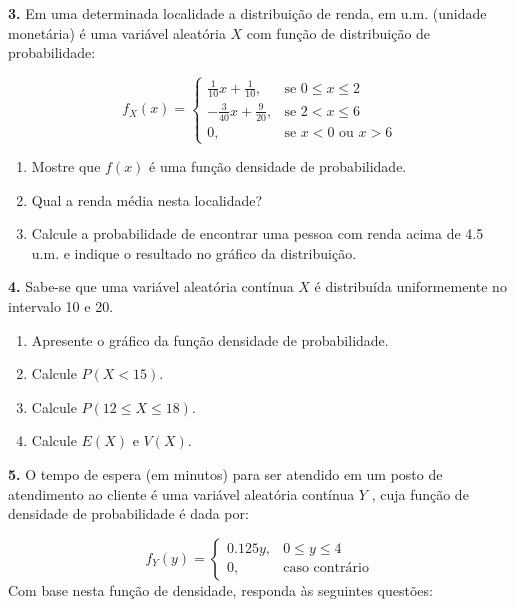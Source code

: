 \documentclass[
]{book}
\providecommand{\tightlist}{%
  \setlength{\itemsep}{0pt}\setlength{\parskip}{0pt}}
\begin{document}
\textbf{3.} Em uma determinada localidade a distribuição de renda, em u.m. (unidade monetária) é uma variável aleatória \(X\) com função de distribuição de probabilidade:

\[
f_{X}(x) = 
\begin{cases} 
\frac{1}{10}x + \frac{1}{10}, & \text{se } 0 \leq x \leq 2 \\[10pt]
-\frac{3}{40}x + \frac{9}{20}, & \text{se } 2 < x \leq 6 \\[10pt]
0, & \text{se } x < 0 \text{ ou } x > 6
\end{cases}
\]

\begin{enumerate}
\def\labelenumi{(\alph{enumi})}
\tightlist
\item
  Mostre que \(f(x)\) é uma função densidade de probabilidade.
\item
  Qual a renda média nesta localidade?
\item
  Calcule a probabilidade de encontrar uma pessoa com renda acima de 4.5 u.m. e indique o resultado no gráfico da distribuição.
\end{enumerate}

\textbf{4.} Sabe-se que uma variável aleatória contínua \(X\) é distribuída uniformemente no intervalo 10 e 20.

\begin{enumerate}
\def\labelenumi{(\alph{enumi})}
\tightlist
\item
  Apresente o gráfico da função densidade de probabilidade.
\item
  Calcule \(P(X < 15)\).
\item
  Calcule \(P(12\leq X \leq 18)\).
\item
  Calcule \(E(X)\) e \(V(X)\).
\end{enumerate}

\textbf{5.} O tempo de espera (em minutos) para ser atendido em um posto de atendimento ao cliente é uma variável aleatória contínua \(Y\) , cuja função de densidade de probabilidade é dada por:

\[
f_{Y}(y) = 
\begin{cases} 
0.125y, & 0\leq y\leq 4 \\[10pt]
0,& \text{caso contrário}
\end{cases}
\]
Com base nesta função de densidade, responda às seguintes questões:
\end{document}
